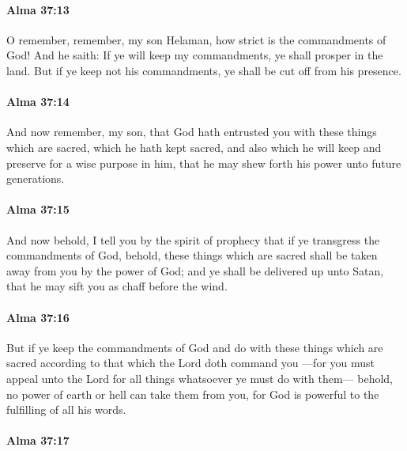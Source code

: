		\paragraph{Alma 37:13} %
			\label{ALMA-37-13}

			O remember, remember, my son Helaman,
			how strict is the commandments of God!
			And he saith:
			If ye will keep my commandments, ye shall prosper in the land.
			But if ye keep not his commandments, ye shall be cut off from his presence.

		\paragraph{Alma 37:14} %
			\label{ALMA-37-14}

			And now remember, my son,
			that God hath entrusted you with these things which are sacred,
			which he hath kept sacred,
			and also which he will keep and preserve for a wise purpose in him,
			that he may shew forth his power unto future generations.

		\paragraph{Alma 37:15} %
			\label{ALMA-37-15}

			And now behold, I tell you by the spirit of prophecy
			that if ye transgress the commandments of God,
			behold, these things which are sacred
			shall be taken away from you by the power of God;
			and ye shall be delivered up unto Satan,
			that he may sift you as chaff before the wind.

		\paragraph{Alma 37:16} %
			\label{ALMA-37-16}

			But if ye keep the commandments of God
			and do with these things which are sacred
			according to that which the Lord doth command you
			---for you must appeal unto the Lord
			for all things whatsoever ye must do with them---
			behold, no power of earth or hell can take them from you,
			for God is powerful to the fulfilling of all his words.

		\paragraph{Alma 37:17} %
			\label{ALMA-37-17}

